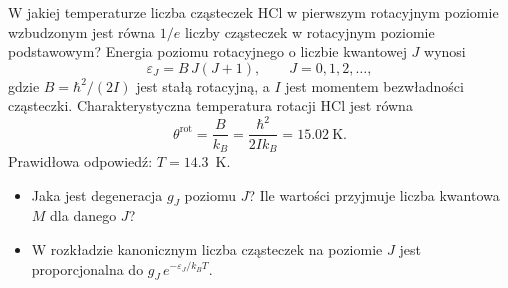 
W jakiej temperaturze liczba cząsteczek HCl w pierwszym rotacyjnym poziomie
wzbudzonym jest równa $1/e$ liczby cząsteczek w rotacyjnym poziomie
podstawowym? Energia poziomu rotacyjnego o liczbie kwantowej $J$ wynosi
\begin{equation*}
  \varepsilon_J = B\,J(J+1), \qquad J = 0, 1, 2, \ldots,
\end{equation*}
gdzie $B = \hbar^2/(2I)$ jest stałą rotacyjną, a $I$ jest momentem
bezwładności cząsteczki. Charakterystyczna temperatura rotacji HCl jest równa
\begin{equation*}
  \theta^\text{rot} = \frac{B}{k_B} = \frac{\hbar^2}{2 I k_B} = 15.02~\text{K} .
\end{equation*}
Prawidłowa odpowiedź: $T = 14.3$~K.

\begin{wskazowki}
\begin{itemize}
  \item Jaka jest degeneracja $g_J$ poziomu $J$? Ile wartości przyjmuje
    liczba kwantowa $M$ dla danego $J$?
  \item W rozkładzie kanonicznym liczba cząsteczek na poziomie $J$ jest
    proporcjonalna do $g_J\,e^{-\varepsilon_J/k_BT}$.
\end{itemize}
\end{wskazowki}
